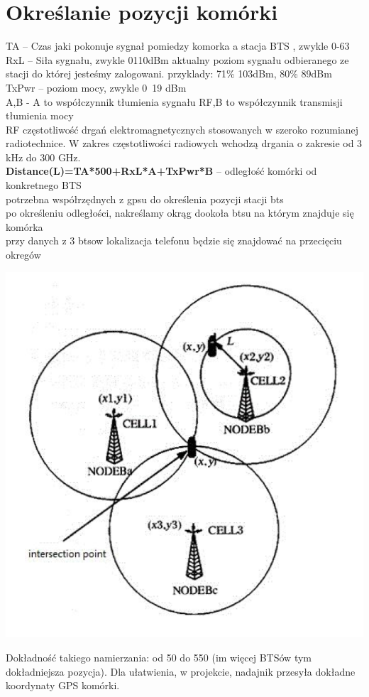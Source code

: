 \documentclass[a4paper,12pt]{article}
\begin{document}
\section{Określanie pozycji komórki}
TA – Czas jaki pokonuje sygnał pomiedzy komorka a stacja BTS , zwykle 0-63\\
RxL – Siła sygnału, zwykle 0110dBm
aktualny poziom sygnału odbieranego ze stacji do której jesteśmy zalogowani.
przyklady: 71\% 103dBm,
80\% 89dBm\\
TxPwr – poziom mocy, zwykle 0~19 dBm\\
A,B - A
to współczynnik tłumienia sygnału RF,B to współczynnik transmisji tłumienia mocy\\
RF częstotliwość
drgań elektromagnetycznych stosowanych w szeroko rozumianej
radiotechnice. W zakres częstotliwości radiowych wchodzą drgania o zakresie od 3 kHz do
300 GHz.\\
\textbf{Distance(L)=TA*500+RxL*A+TxPwr*B} -- odległość komórki od konkretnego
BTS\\
potrzebna współrzędnych z gpsu do określenia pozycji stacji bts\\
po określeniu odległości, nakreślamy okrąg dookoła btsu na którym znajduje się komórka\\
przy danych z 3 btsow lokalizacja telefonu będzie się znajdować na przecięciu okregów\\
\begin{center}
\includegraphics[scale=0.75]{intersection.png}
\end{center}
Dokładność takiego namierzania: od 50 do 550 (im więcej BTSów tym dokładniejsza
pozycja). Dla ułatwienia, w projekcie, nadajnik przesyła dokładne koordynaty GPS komórki.
\end{document}
